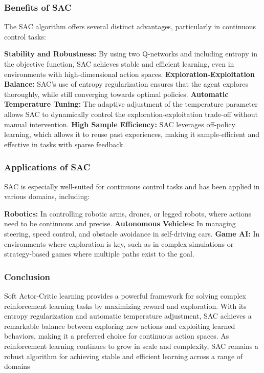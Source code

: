 \subsubsection*{Benefits of SAC}

The SAC algorithm offers several distinct advantages, particularly in continuous control tasks:

\textbf{Stability and Robustness:} By using two Q-networks and including entropy in the objective function, SAC achieves stable and efficient learning, even in environments with high-dimensional action spaces.
\textbf{Exploration-Exploitation Balance:} SAC’s use of entropy regularization ensures that the agent explores thoroughly, while still converging towards optimal policies.
\textbf{Automatic Temperature Tuning:} The adaptive adjustment of the temperature parameter allows SAC to dynamically control the exploration-exploitation trade-off without manual intervention.
\textbf{High Sample Efficiency:} SAC leverages off-policy learning, which allows it to reuse past experiences, making it sample-efficient and effective in tasks with sparse feedback.
\subsubsection*{Applications of SAC}

SAC is especially well-suited for continuous control tasks and has been applied in various domains, including:

\textbf{Robotics:} In controlling robotic arms, drones, or legged robots, where actions need to be continuous and precise.
\textbf{Autonomous Vehicles:} In managing steering, speed control, and obstacle avoidance in self-driving cars.
\textbf{Game AI:} In environments where exploration is key, such as in complex simulations or strategy-based games where multiple paths exist to the goal.
\subsubsection*{Conclusion}

Soft Actor-Critic learning provides a powerful framework for solving complex reinforcement learning tasks by maximizing reward and exploration. With its entropy regularization and automatic temperature adjustment, SAC achieves a remarkable balance between exploring new actions and exploiting learned behaviors, making it a preferred choice for continuous action spaces. As reinforcement learning continues to grow in scale and complexity, SAC remains a robust algorithm for achieving stable and efficient learning across a range of domains

